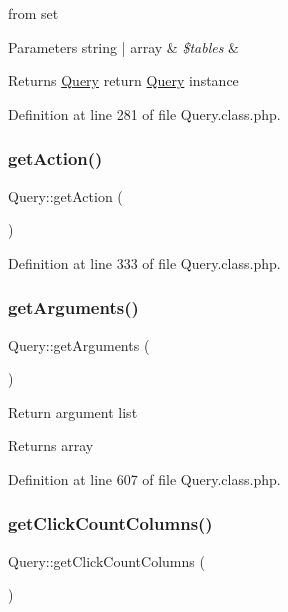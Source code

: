 from set 
\begin{DoxyParams}[1]{Parameters}
string | array & {\em \$tables} & \\
\hline
\end{DoxyParams}
\begin{DoxyReturn}{Returns}
\hyperlink{classQuery}{Query} return \hyperlink{classQuery}{Query} instance 
\end{DoxyReturn}


Definition at line 281 of file Query.\+class.\+php.

\mbox{\label{classQuery_af51085dc05333d2a51cda11152c51b31}} 
\subsubsection{\texorpdfstring{get\+Action()}{getAction()}}
{\footnotesize\ttfamily Query\+::get\+Action (\begin{DoxyParamCaption}{ }\end{DoxyParamCaption})}



Definition at line 333 of file Query.\+class.\+php.

\mbox{\label{classQuery_af50db41315e7cd2b0c05040933905d11}} 
\subsubsection{\texorpdfstring{get\+Arguments()}{getArguments()}}
{\footnotesize\ttfamily Query\+::get\+Arguments (\begin{DoxyParamCaption}{ }\end{DoxyParamCaption})}

Return argument list \begin{DoxyReturn}{Returns}
array 
\end{DoxyReturn}


Definition at line 607 of file Query.\+class.\+php.

\mbox{\label{classQuery_ab762a676eb3b0a5f78b3bccd04af233f}} 
\subsubsection{\texorpdfstring{get\+Click\+Count\+Columns()}{getClickCountColumns()}}
{\footnotesize\ttfamily Query\+::get\+Click\+Count\+Columns (\begin{DoxyParamCaption}{ }\end{DoxyParamCaption})}



